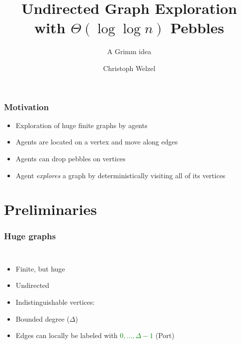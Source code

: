 \documentclass{beamer}
\title{Undirected Graph Exploration with $\Theta(\log\log n)$ Pebbles}
\subtitle{A Grimm idea}
\author{Christoph Welzel}
\institute{Logik und Theorie diskreter Systeme, RWTH Aachen}
\begin{document}
\maketitle
\begin{frame}
  \frametitle{Motivation}
  \begin{itemize}
    \item Exploration of huge finite graphs by agents
    \item Agents are located on a vertex and move along edges
    \item Agents can drop pebbles on vertices
    \item Agent \emph{explores} a graph by deterministically visiting all of
      its vertices
  \end{itemize}
\end{frame}

\section{Preliminaries}
\begin{frame}
  \frametitle{Huge graphs}
  \begin{columns}
    \begin{itemize}
      \item Finite, but huge
      \item Undirected
      \item Indistinguishable vertices:
      \parbox{\baselineskip}{
        \resizebox{!}{\baselineskip}{
          \begin{tikzpicture}
            \node[node] {};
          \end{tikzpicture}
        }
      }
      \item Bounded degree ($\Delta$)
      \item Edges can locally be labeled with
        \textcolor{green}{$0,\dots,\Delta-1$} (Port)
    \end{itemize}
    \begin{center}
      \resizebox{\textwidth}{!}{}
    \end{center}
  \end{columns}
\end{frame}
\end{document}
